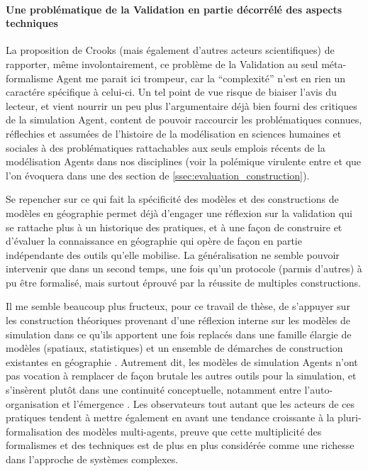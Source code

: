 \paragraph{Une problématique de la Validation en partie décorrélé des aspects techniques}
\label{decorreler_validation}

La proposition de Crooks (mais également d'autres acteurs scientifiques) de rapporter, même involontairement, ce problème de la Validation au seul méta-formalisme Agent me parait ici trompeur, car la \enquote{complexité} n'est en rien un caractére spécifique à celui-ci. Un tel point de vue risque de biaiser l'avis du lecteur, et vient nourrir un peu plus l'argumentaire déjà bien fourni des critiques de la simulation Agent, content de pouvoir raccourcir les problématiques connues, réflechies et assumées de l'histoire de la modélisation en sciences humaines et sociales à des problématiques rattachables aux seuls emplois récents de la modélisation Agents dans nos disciplines (voir la polémique virulente entre \textcite{Yanoff2008} et \textcites{Elsenbroich2012,Chattoe2011} que l'on évoquera dans une des section de \ref{ssec:evaluation_construction}).

Se repencher sur ce qui fait la spécificité des modèles et des constructions de modèles en géographie permet déjà d'engager une réflexion sur la validation qui se rattache plus à un historique des pratiques, et à une façon de construire et d'évaluer la connaissance en géographie qui opère de façon en partie indépendante des outils qu'elle mobilise. La généralisation ne semble pouvoir intervenir que dans un second temps, une fois qu'un protocole (parmis d'autres) à pu être formalisé, mais surtout éprouvé par la réussite de multiples constructions. %

Il me semble beaucoup plus fructeux, pour ce travail de thèse, de s'appuyer sur les construction théoriques provenant d'une réflexion interne sur les modèles de simulation dans ce qu'ils apportent une fois replacés dans une famille élargie de modèles (spatiaux, statistiques) et un ensemble de démarches de construction existantes en géographie \autocites{Geopoint2000, Mathian2014, Sanders2007}. Autrement dit, les modèles de simulation Agents n'ont pas vocation à remplacer de façon brutale les autres outils pour la simulation, et s'insèrent plutôt dans une continuité conceptuelle, notamment entre l'auto-organisation et l'émergence \autocites{Pumain2013}[851]{Sanders2013}. Les observateurs \autocites{Varenne2008b,Varenne2012a} tout autant que les acteurs \autocite{Sanders2013}  de ces pratiques tendent à mettre également en avant une tendance croissante à la pluri-formalisation des modèles multi-agents, preuve que cette multiplicité des formalismes et des techniques est de plus en plus considérée comme une richesse dans l'approche de systèmes complexes.

